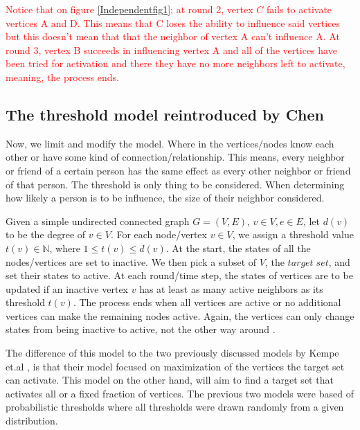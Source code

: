 \textcolor{red}{
Notice that on figure \ref{Independentfig1}; at round 2, vertex $C$ fails to activate vertices A and D. This means that C loses the ability to influence said vertices but this doesn't mean that that the neighbor of vertex A can't influence A. At round 3, vertex B succeeds in influencing vertex A and all of the vertices have been tried for activation and there they have no more neighbors left to activate, meaning, the process ends.}
\subsection{The threshold model reintroduced by Chen}

Now, we limit and modify the model. Where in the vertices/nodes know each other or have some kind of connection/relationship. This means, every neighbor or friend of a certain person has the same effect as every other neighbor or friend of that person. The threshold is only thing to be considered. When determining how likely a person is to be influence, the size of their neighbor considered.

Given a simple undirected connected graph $G=(V,E)$, $v \in V, e \in E$, let $d(v)$ to be the degree of $v \in V$. For each node/vertex $v \in V$, we assign a threshold value $t(v) \in \mathbb{N}$, where $1 \leq t(v) \leq d(v)$. At the start, the states of all the nodes/vertices are set to inactive. We then pick a subset of $V$, the $target\; set$, and set their states to active. At each round/time step, the states of vertices are to be updated if an inactive vertex $v$ has at least as many active neighbors as its threshold $t(v)$. The process ends when all vertices are active or no additional vertices can make the remaining nodes active. Again, the vertices can only change states from being inactive to active, not the other way around \cite{chen}.

The difference of this model to the two previously discussed models by Kempe et.al \cite{Kempe}\cite{Shakarian:2012:LSN:2456719.2457081}, is that their model focused on maximization of the vertices the target set can activate. This model on the other hand, will aim to find a target set that activates all or a fixed fraction of vertices. The previous two models were based of probabilistic thresholds where all thresholds were drawn randomly from a given distribution. \cite{Kempe}\cite{chen}


